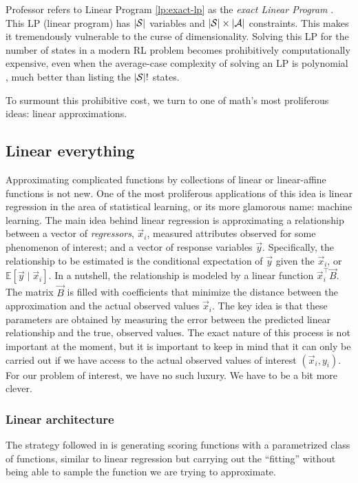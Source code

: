 Professor \citeauthor{farias2002thesis} refers to Linear Program
\eqref{lp:exact-lp} as the \textit{exact Linear Program}
\cite[Ch.~2.3]{farias2002thesis}. This LP (linear program) has $|\mathcal{S}|$
variables and $|\mathcal{S}| \times |\mathcal{A}|$ constraints. This makes it
tremendously vulnerable to the curse of dimensionality. Solving this LP for the
number of states in a modern RL problem becomes prohibitively computationally
expensive, even when the average-case complexity of solving an LP is polynomial
\cite[pg.~147]{kochenderfer2022}, much better than listing the $|\mathcal{S}|!$
states.

To surmount this prohibitive cost, we turn to one of math's most proliferous
ideas: linear approximations.

\subsection{Linear everything}

Approximating complicated functions by collections of linear or linear-affine
functions is not new. One of the most proliferous applications of this idea is
linear regression in the area of statistical learning, or its more glamorous
name: machine learning. The main idea behind linear regression is approximating
a relationship between a vector of \textit{regressors}, $\vec{x}_i$, measured
attributes observed for some phenomenon of interest; and a vector of response
variables $\vec{y}$. Specifically, the relationship to be estimated is the
conditional expectation of $\vec{y}$ given the $\vec{x}_i$, or $\mathbb{E}
\left[ \vec{y} \mid \vec{x}_i \right]$. In a nutshell, the relationship is
modeled by a linear function $\vec{x}_{i}^{\top} \vec{B}$. The matrix $\vec{B}$
is filled with coefficients that minimize the distance between the approximation
and the actual observed values $\vec{x}_i$. The key idea is that these
parameters are obtained by measuring the error between the predicted linear
relationship and the true, observed values. The exact nature of this process is
not important at the moment, but it is important to keep in mind that it can
only be carried out if we have access to the actual observed values of interest
$(\vec{x}_i, y_i)$. For our problem of interest, we have no such luxury. We have
to be a bit more clever.

\subsubsection{Linear architecture}
The strategy followed in \cite{farias2002thesis} is generating scoring functions
with a pa\-ra\-me\-trized class of functions, similar to linear regression but
carrying out the ``fitting'' without being able to sample the function we are
trying to approximate.

